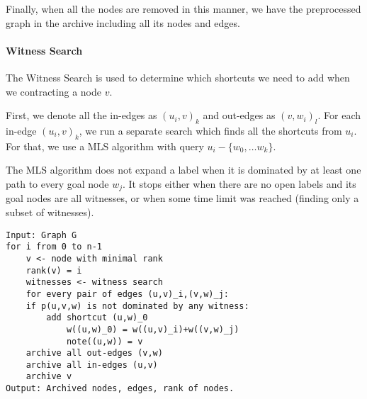 
Finally, when all the nodes are removed in this manner, we have the preprocessed graph in the archive including all its nodes and edges.

\paragraph*{Witness Search}
The Witness Search is used to determine which shortcuts we need to add when we contracting a node $v$. 

First, we denote all the in-edges as $(u_i,v)_k$ and out-edges as $(v,w_i)_l$. For each in-edge $(u_i,v)_k$, we run a separate search which finds all the shortcuts from $u_i$. For that, we use a MLS algorithm with query $u_i-\{w_0,\dots w_k\}$. 

The MLS algorithm does not expand a label when it is dominated by at least one path to every goal node $w_j$. It stops either when there are no open labels and its goal nodes are all witnesses,
or when some time limit was reached (finding only a subset of witnesses). 

\renewcommand{\lstlistingname}{Pseudocode}
\begin{lstlisting}[caption={MCHp},label=MCHp,captionpos=t,float,abovecaptionskip=-\medskipamount]
Input: Graph G
for i from 0 to n-1
    v <- node with minimal rank
    rank(v) = i
    witnesses <- witness search
    for every pair of edges (u,v)_i,(v,w)_j:
    if p(u,v,w) is not dominated by any witness:
        add shortcut (u,w)_0
            w((u,w)_0) = w((u,v)_i)+w((v,w)_j)
            note((u,w)) = v
    archive all out-edges (v,w) 
    archive all in-edges (u,v)
    archive v
Output: Archived nodes, edges, rank of nodes.
\end{lstlisting}
